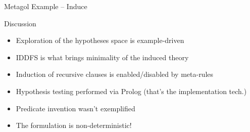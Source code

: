\documentclass[presentation]{beamer}\mode<presentation>{\usetheme{AMSBolognaFC}}
\begin{document}
\begin{frame}[allowframebreaks]{Metagol Example -- Induce }
    \framebreak
\end{frame}

\begin{frame}{Discussion}
    \begin{itemize}
        \item Exploration of the hypotheses space is example-driven
        \item IDDFS is what brings minimality of the induced theory
        \item Induction of recursive clauses is enabled/disabled by meta-rules
        \item Hypothesis testing performed via Prolog (that's the implementation tech.)
        \item Predicate invention wasn't exemplified
        \item The formulation is non-deterministic!
    \end{itemize}
\end{frame}
\end{document}
